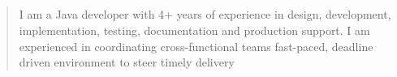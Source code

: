 \documentclass[10pt,a4paper,ragged2e,withhyper]{altacv}
\begin{document}
\begin{paracol}{2}
        
         \\
         
         \\
         \\
         \\ 
        
            

            
        
        
        
        \newpage
        
        \switchcolumn
        
            \begin{quote}
                I am a Java developer with 4+  years of experience in design, development, implementation, testing, documentation and production support. I am experienced in coordinating cross-functional teams fast-paced, deadline driven environment to steer timely delivery
            \end{quote}
        

\end{paracol}
\end{document}
